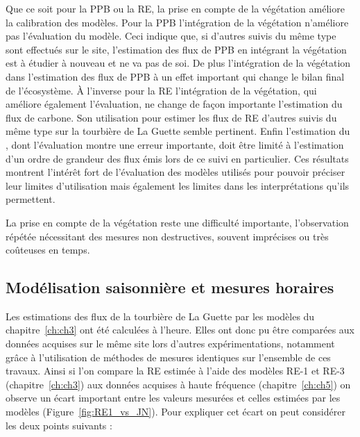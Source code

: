 Que ce soit pour la PPB ou la RE, la prise en compte de la végétation améliore la calibration des modèles.
Pour la PPB l'intégration de la végétation n'améliore pas l'évaluation du modèle.
Ceci indique que, si d'autres suivis du même type sont effectués sur le site, l'estimation des flux de PPB en intégrant la végétation est à étudier à nouveau et ne va pas de soi.
De plus l'intégration de la végétation dans l'estimation des flux de PPB à un effet important qui change le bilan final de l'écosystème.
À l'inverse pour la RE l'intégration de la végétation, qui améliore également l'évaluation, ne change de façon importante l'estimation du flux de carbone.
Son utilisation pour estimer les flux de RE d'autres suivis du même type sur la tourbière de La Guette semble pertinent.
Enfin l'estimation du \chh, dont l'évaluation montre une erreur importante, doit être limité à l'estimation d'un ordre de grandeur des flux émis lors de ce suivi en particulier.
Ces résultats montrent l'intérêt fort de l'évaluation des modèles utilisés pour pouvoir préciser leur limites d'utilisation mais également les limites dans les interprétations qu'ils permettent.

La prise en compte de la végétation reste une difficulté importante, l'observation répétée nécessitant des mesures non destructives, souvent imprécises ou très coûteuses en temps.


\subsection*{Modélisation saisonnière et mesures horaires}

Les estimations des flux de la tourbière de La Guette par les modèles du chapitre~\ref{ch:ch3} ont été calculées à l'heure.
Elles ont donc pu être comparées aux données acquises sur le même site lors d'autres expérimentations, notamment grâce à l'utilisation de méthodes de mesures identiques sur l'ensemble de ces travaux.
Ainsi si l'on compare la RE estimée à l'aide des modèles RE-1 et RE-3 (chapitre~\ref{ch:ch3}) aux données acquises à haute fréquence (chapitre~\ref{ch:ch5}) on observe un écart important entre les valeurs mesurées et celles estimées par les modèles (Figure~\ref{fig:RE1_vs_JN}).
Pour expliquer cet écart on peut considérer les deux points suivants : 

